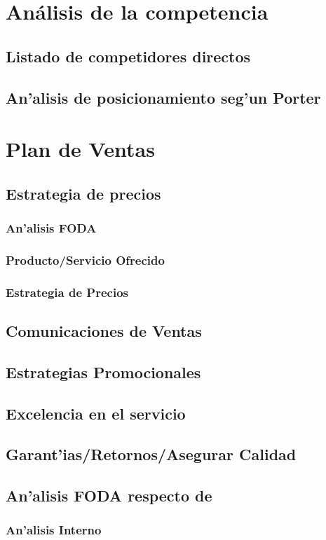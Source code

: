 \documentclass[letterpaper,openright,10pt,oneside]{report}
\begin{document}
	\chapter{Análisis de la competencia}
		\section{Listado de competidores directos}
		\section{An'alisis de posicionamiento seg'un Porter}
	\chapter{Plan de Ventas}
		\section{Estrategia de precios}
			\subsection{An'alisis FODA}
			\subsection{Producto/Servicio Ofrecido}
			\subsection{Estrategia de Precios}
		\section{Comunicaciones de Ventas}
		\section{Estrategias Promocionales}
		\section{Excelencia en el servicio}
		\section{Garant'ias/Retornos/Asegurar Calidad}
		\section{An'alisis FODA respecto de}
			\subsection{An'alisis Interno}
\end{document}
